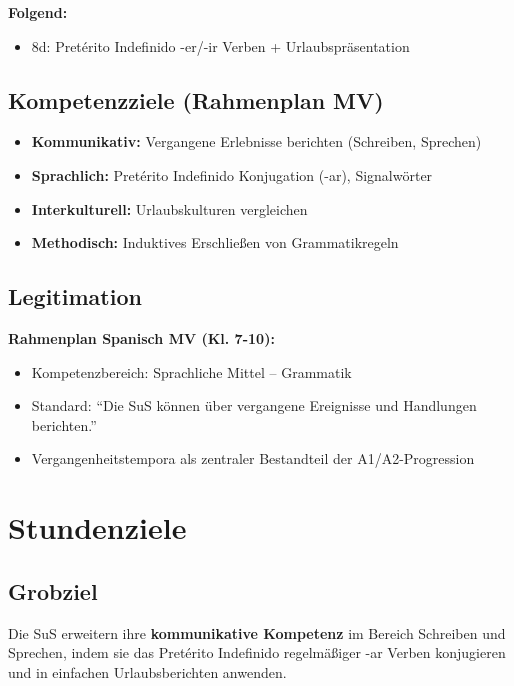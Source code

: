 \documentclass[11pt,a4paper]{article}
\begin{document}
\textbf{Folgend:}
\begin{itemize}
    \item 8d: Pretérito Indefinido -er/-ir Verben + Urlaubspräsentation
\end{itemize}

\subsection{Kompetenzziele (Rahmenplan MV)}
\begin{itemize}
    \item \textbf{Kommunikativ:} Vergangene Erlebnisse berichten (Schreiben, Sprechen)
    \item \textbf{Sprachlich:} Pretérito Indefinido Konjugation (-ar), Signalwörter
    \item \textbf{Interkulturell:} Urlaubskulturen vergleichen
    \item \textbf{Methodisch:} Induktives Erschließen von Grammatikregeln
\end{itemize}

\subsection{Legitimation}
\textbf{Rahmenplan Spanisch MV (Kl. 7-10):}
\begin{itemize}
    \item Kompetenzbereich: Sprachliche Mittel -- Grammatik
    \item Standard: ``Die SuS können über vergangene Ereignisse und Handlungen berichten.''
    \item Vergangenheitstempora als zentraler Bestandteil der A1/A2-Progression
\end{itemize}

\section{Stundenziele}

\subsection{Grobziel}
Die SuS erweitern ihre \textbf{kommunikative Kompetenz} im Bereich Schreiben und Sprechen, indem sie das Pretérito Indefinido regelmäßiger -ar Verben konjugieren und in einfachen Urlaubsberichten anwenden.
\end{document}
